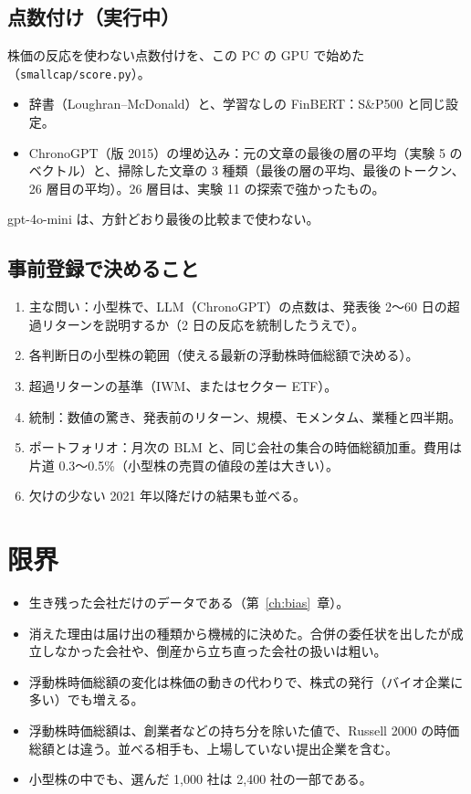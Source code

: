 \documentclass[xelatex,ja=standard,jafont=haranoaji,a4paper,10pt,openany]{bxjsreport}
\newcommand{\code}[1]{\texttt{#1}}
\newcommand{\SP}{S\&P500}
\newcommand{\chapref}[1]{第~\ref{#1}~章}
\begin{document}
\section{点数付け（実行中）}

株価の反応を使わない点数付けを、この PC の GPU で始めた（\code{smallcap/score.py}）。

\begin{itemize}
\item 辞書（Loughran--McDonald）と、学習なしの FinBERT：\SP{} と同じ設定。
\item ChronoGPT（版 2015）の埋め込み：元の文章の最後の層の平均（実験 5 のベクトル）と、掃除した文章の 3 種類（最後の層の平均、最後のトークン、26 層目の平均）。26 層目は、実験 11 の探索で強かったもの。
\end{itemize}

gpt-4o-mini は、方針どおり最後の比較まで使わない。

\section{事前登録で決めること}

\begin{enumerate}
\item 主な問い：小型株で、LLM（ChronoGPT）の点数は、発表後 2〜60 日の超過リターンを説明するか（2 日の反応を統制したうえで）。
\item 各判断日の小型株の範囲（使える最新の浮動株時価総額で決める）。
\item 超過リターンの基準（IWM、またはセクター ETF）。
\item 統制：数値の驚き、発表前のリターン、規模、モメンタム、業種と四半期。
\item ポートフォリオ：月次の BLM と、同じ会社の集合の時価総額加重。費用は片道 0.3〜0.5\%（小型株の売買の値段の差は大きい）。
\item 欠けの少ない 2021 年以降だけの結果も並べる。
\end{enumerate}

\chapter{限界}\label{ch:limits}

\begin{itemize}
\item 生き残った会社だけのデータである（\chapref{ch:bias}）。
\item 消えた理由は届け出の種類から機械的に決めた。合併の委任状を出したが成立しなかった会社や、倒産から立ち直った会社の扱いは粗い。
\item 浮動株時価総額の変化は株価の動きの代わりで、株式の発行（バイオ企業に多い）でも増える。
\item 浮動株時価総額は、創業者などの持ち分を除いた値で、Russell 2000 の時価総額とは違う。並べる相手も、上場していない提出企業を含む。
\item 小型株の中でも、選んだ 1,000 社は 2,400 社の一部である。
\end{itemize}
\end{document}

